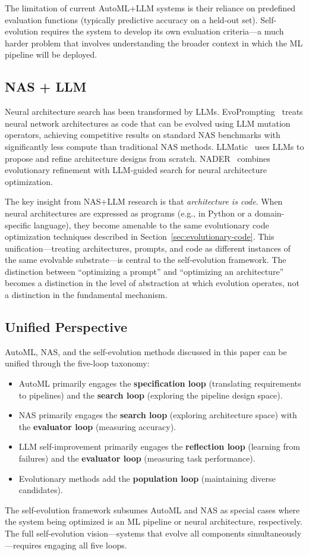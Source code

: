 \documentclass[11pt,a4paper]{article}
\begin{document}
The limitation of current AutoML+LLM systems is their reliance on predefined evaluation functions (typically predictive accuracy on a held-out set). Self-evolution requires the system to develop its own evaluation criteria---a much harder problem that involves understanding the broader context in which the ML pipeline will be deployed.

\subsection{NAS + LLM}

Neural architecture search has been transformed by LLMs. EvoPrompting~\citep{chen2024evoprompting} treats neural network architectures as code that can be evolved using LLM mutation operators, achieving competitive results on standard NAS benchmarks with significantly less compute than traditional NAS methods. LLMatic~\citep{llmatic2023} uses LLMs to propose and refine architecture designs from scratch. NADER~\citep{nader2024} combines evolutionary refinement with LLM-guided search for neural architecture optimization.

The key insight from NAS+LLM research is that \emph{architecture is code}. When neural architectures are expressed as programs (e.g., in Python or a domain-specific language), they become amenable to the same evolutionary code optimization techniques described in Section~\ref{sec:evolutionary-code}. This unification---treating architectures, prompts, and code as different instances of the same evolvable substrate---is central to the self-evolution framework. The distinction between ``optimizing a prompt'' and ``optimizing an architecture'' becomes a distinction in the level of abstraction at which evolution operates, not a distinction in the fundamental mechanism.

\subsection{Unified Perspective}

AutoML, NAS, and the self-evolution methods discussed in this paper can be unified through the five-loop taxonomy:
\begin{itemize}
\item AutoML primarily engages the \textbf{specification loop} (translating requirements to pipelines) and the \textbf{search loop} (exploring the pipeline design space).
\item NAS primarily engages the \textbf{search loop} (exploring architecture space) with the \textbf{evaluator loop} (measuring accuracy).
\item LLM self-improvement primarily engages the \textbf{reflection loop} (learning from failures) and the \textbf{evaluator loop} (measuring task performance).
\item Evolutionary methods add the \textbf{population loop} (maintaining diverse candidates).
\end{itemize}
The self-evolution framework subsumes AutoML and NAS as special cases where the system being optimized is an ML pipeline or neural architecture, respectively. The full self-evolution vision---systems that evolve all components simultaneously---requires engaging all five loops.
\end{document}
